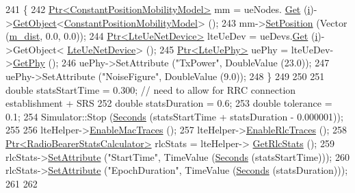 \begin{DoxyCode}
241     \{
242       \hyperlink{classns3_1_1Ptr}{Ptr<ConstantPositionMobilityModel>} mm = ueNodes.
      \hyperlink{classns3_1_1NodeContainer_a9ed96e2ecc22e0f5a3d4842eb9bf90bf}{Get} (\hyperlink{bernuolliDistribution_8m_a6f6ccfcf58b31cb6412107d9d5281426}{i})->\hyperlink{classns3_1_1Object_a13e18c00017096c8381eb651d5bd0783}{GetObject}<\hyperlink{classns3_1_1ConstantPositionMobilityModel}{ConstantPositionMobilityModel}> ();
243       mm->\hyperlink{classns3_1_1MobilityModel_ac584b3d5a309709d2f13ed6ada1e7640}{SetPosition} (Vector (\hyperlink{classLenaTdMtFfMacSchedulerTestCase_a0aa6a40e725666a870d8c94c21ba156d}{m\_dist}, 0.0, 0.0));
244       \hyperlink{classns3_1_1Ptr}{Ptr<LteUeNetDevice>} lteUeDev = ueDevs.\hyperlink{classns3_1_1NetDeviceContainer_a677d62594b5c9d2dea155cc5045f4d0b}{Get} (\hyperlink{bernuolliDistribution_8m_a6f6ccfcf58b31cb6412107d9d5281426}{i})->GetObject<
      \hyperlink{classns3_1_1LteUeNetDevice}{LteUeNetDevice}> ();
245       \hyperlink{classns3_1_1Ptr}{Ptr<LteUePhy>} uePhy = lteUeDev->\hyperlink{classns3_1_1LteUeNetDevice_a2a9940a1e457a8bf3dae87fed4199c7a}{GetPhy} ();
246       uePhy->SetAttribute (\textcolor{stringliteral}{"TxPower"}, DoubleValue (23.0));
247       uePhy->SetAttribute (\textcolor{stringliteral}{"NoiseFigure"}, DoubleValue (9.0));
248     \}
249 
250 
251   \textcolor{keywordtype}{double} statsStartTime = 0.300; \textcolor{comment}{// need to allow for RRC connection establishment + SRS}
252   \textcolor{keywordtype}{double} statsDuration = 0.6;
253   \textcolor{keywordtype}{double} tolerance = 0.1;
254   Simulator::Stop (\hyperlink{group__timecivil_ga33c34b816f8ff6628e33d5c8e9713b9e}{Seconds} (statsStartTime + statsDuration - 0.000001));
255 
256   lteHelper->\hyperlink{classns3_1_1LteHelper_affa3a12841520407d3662417fe41863d}{EnableMacTraces} ();
257   lteHelper->\hyperlink{classns3_1_1LteHelper_abadfdd04d30b261e9b6f0846b4784928}{EnableRlcTraces} ();
258   \hyperlink{classns3_1_1Ptr}{Ptr<RadioBearerStatsCalculator>} rlcStats = lteHelper->
      \hyperlink{classns3_1_1LteHelper_a6eb438ccf69642e3863adea4991fa2ca}{GetRlcStats} ();
259   rlcStats->\hyperlink{classns3_1_1ObjectBase_ac60245d3ea4123bbc9b1d391f1f6592f}{SetAttribute} (\textcolor{stringliteral}{"StartTime"}, TimeValue (\hyperlink{group__timecivil_ga33c34b816f8ff6628e33d5c8e9713b9e}{Seconds} (statsStartTime)));
260   rlcStats->\hyperlink{classns3_1_1ObjectBase_ac60245d3ea4123bbc9b1d391f1f6592f}{SetAttribute} (\textcolor{stringliteral}{"EpochDuration"}, TimeValue (\hyperlink{group__timecivil_ga33c34b816f8ff6628e33d5c8e9713b9e}{Seconds} (statsDuration)));
261 
262 

\end{DoxyCode}

